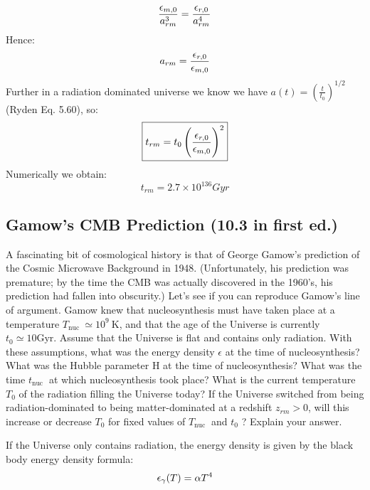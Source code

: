 \begin{equation}
    \frac{\epsilon_{m, 0}}{a_{rm}^3} = \frac{\epsilon_{r, 0}}{a_{rm}^4}
\end{equation}
Hence:
\begin{equation}
    a_{rm} = \frac{\epsilon_{r, 0}}{\epsilon_{m, 0}}
\end{equation}
Further in a radiation dominated universe we know we have $a(t) = \left(\frac{t}{t_0}\right)^{1/2}$ (Ryden Eq. 5.60), so:
\begin{equation}
    \boxed{t_{rm} = t_0 \left(\frac{\epsilon_{r, 0}}{\epsilon_{m, 0}}\right)^2}
\end{equation}
Numerically we obtain:
\begin{equation}
    \boxed{t_{rm} = 2.7 \times 10^{136}\si{Gyr}}
\end{equation}

\subsection*{Gamow's CMB Prediction (10.3 in first ed.)}
\begin{tcolorbox}
    A fascinating bit of cosmological history is that of George Gamow's prediction of the Cosmic Microwave Background in 1948. (Unfortunately, his prediction was premature; by the time the CMB was actually discovered in the 1960's, his prediction had fallen into obscurity.) Let's see if you can reproduce Gamow's line of argument. Gamow knew that nucleosynthesis must have taken place at a temperature $T_{\text {nuc }} \simeq 10^{9} \mathrm{~K}$, and that the age of the Universe is currently $t_{0} \simeq 10 \mathrm{Gyr}$. Assume that the Universe is flat and contains only radiation. With these assumptions, what was the energy density $\epsilon$ at the time of nucleosynthesis? What was the Hubble parameter $\mathrm{H}$ at the time of nucleosynthesis? What was the time $t_{\text {nuc }}$ at which nucleosynthesis took place? What is the current temperature $T_{0}$ of the radiation filling the Universe today? If the Universe switched from being radiation-dominated to being matter-dominated at a redshift $z_{r m}>0$, will this increase or decrease $T_{0}$ for fixed values of $T_{\text {nuc }}$ and $t_{0}$ ? Explain your answer.
\end{tcolorbox}
\noindent 
If the Universe only contains radiation, the energy density is given by the black body energy density formula:
\begin{equation}
    \epsilon_\gamma(T) = \alpha T^4
\end{equation}
